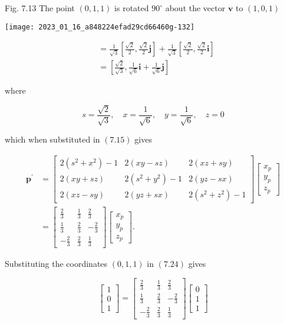 Fig. 7.13 The point $(0,1,1)$ is rotated $90^{\circ}$ about the vector $\mathbf{v}$ to $(1,0,1)$

\begin{center}
\texttt{[image: 2023\_01\_16\_a848224efad29cd66460g-132]}
\end{center}

$$
\begin{aligned}
& =\frac{1}{\sqrt{3}}\left[\frac{\sqrt{2}}{2}, \frac{\sqrt{2}}{2} \mathbf{j}\right]+\frac{1}{\sqrt{3}}\left[\frac{\sqrt{2}}{2}, \frac{\sqrt{2}}{2} \mathbf{i}\right] \\
& =\left[\frac{\sqrt{2}}{\sqrt{3}}, \frac{1}{\sqrt{6}} \mathbf{i}+\frac{1}{\sqrt{6}} \mathbf{j}\right]
\end{aligned}
$$

where

$$
s=\frac{\sqrt{2}}{\sqrt{3}}, \quad x=\frac{1}{\sqrt{6}}, \quad y=\frac{1}{\sqrt{6}}, \quad z=0
$$

which when substituted in $(7.15)$ gives

$$
\begin{aligned}
\mathbf{p}^{\prime} & =\left[\begin{array}{ccc}
2\left(s^{2}+x^{2}\right)-1 & 2(x y-s z) & 2(x z+s y) \\
2(x y+s z) & 2\left(s^{2}+y^{2}\right)-1 & 2(y z-s x) \\
2(x z-s y) & 2(y z+s x) & 2\left(s^{2}+z^{2}\right)-1
\end{array}\right]\left[\begin{array}{l}
x_{p} \\
y_{p} \\
z_{p}
\end{array}\right] \\
& =\left[\begin{array}{ccc}
\frac{2}{3} & \frac{1}{3} & \frac{2}{3} \\
\frac{1}{3} & \frac{2}{3} & -\frac{2}{3} \\
-\frac{2}{3} & \frac{2}{3} & \frac{1}{3}
\end{array}\right]\left[\begin{array}{l}
x_{p} \\
y_{p} \\
z_{p}
\end{array}\right] .
\end{aligned}
$$

Substituting the coordinates $(0,1,1)$ in $(7.24)$ gives

$$
\left[\begin{array}{l}
1 \\
0 \\
1
\end{array}\right]=\left[\begin{array}{ccc}
\frac{2}{3} & \frac{1}{3} & \frac{2}{3} \\
\frac{1}{3} & \frac{2}{3} & -\frac{2}{3} \\
-\frac{2}{3} & \frac{2}{3} & \frac{1}{3}
\end{array}\right]\left[\begin{array}{l}
0 \\
1 \\
1
\end{array}\right]
$$

